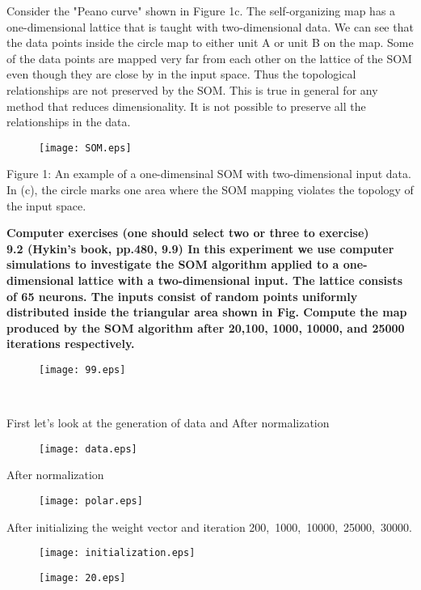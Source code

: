 \noindent Consider the "Peano curve" shown in Figure 1c. The self-organizing map has a one-dimensional
lattice that is taught with two-dimensional data. We can see that the data points inside the circle
map to either unit A or unit B on the map. Some of the data points are mapped very far from
each other on the lattice of the SOM even though they are close by in the input space. Thus the
topological relationships are not preserved by the SOM. This is true in general for any method that
reduces dimensionality. It is not possible to preserve all the relationships in the data.
\begin{figure}[!h]
  \centering
  \texttt{[image: SOM.eps]}
\end{figure}
\newline Figure 1: An example of a one-dimensinal SOM with two-dimensional input data. In (c), the circle marks one area where the SOM mapping violates the topology of the input space.

\noindent \textbf{Computer exercises (one should select two or three to exercise)\\
9.2 (Hykin’s book, pp.480, 9.9) In this experiment we use computer simulations to investigate the SOM
algorithm applied to a one-dimensional lattice with a two-dimensional input. The lattice consists of 65
neurons. The inputs consist of random points uniformly distributed inside the triangular area shown in
Fig. Compute the map produced by the SOM algorithm after 20,100, 1000, 10000, and 25000
iterations respectively.}

\begin{figure}[!h]
  \centering
  \texttt{[image: 99.eps]}
\end{figure}

~

\noindent First let's look at the generation of data and After normalization
\begin{figure}[!h]
  \centering
  \texttt{[image: data.eps]}
\end{figure}

\noindent After normalization
\begin{figure}[!h]
  \centering
  \texttt{[image: polar.eps]}
\end{figure}

\newpage
After initializing the weight vector and iteration 200,~1000,~10000,~25000,~30000.
\begin{figure}[!h]
\begin{minipage}
{0.5\linewidth}
\centering
\texttt{[image: initialization.eps]}
\end{minipage}
%
\begin{minipage}
{0.5\linewidth}
\centering
\texttt{[image: 20.eps]}
\end{minipage}
\end{figure}

